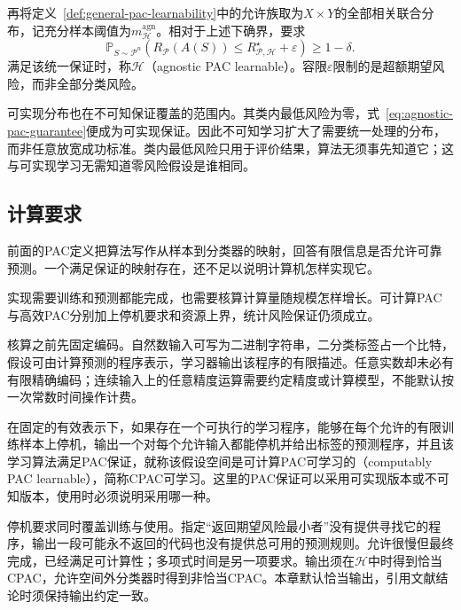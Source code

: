 再将定义~\ref{def:general-pac-learnability}中的允许族取为$X\times Y$的全部相关联合分布，记充分样本阈值为$m_{\mathcal H}^{\mathrm{agn}}$。相对于上述下确界，要求
\begin{equation}
 \mathbb P_{S\sim\mathcal P^n}\left(
 R_{\mathcal P}(A(S))\leq R_{\mathcal P,\mathcal H}^\star+\varepsilon
 \right)\geq1-\delta.
 \label{eq:agnostic-pac-guarantee}
\end{equation}
满足该统一保证时，称$\mathcal H$（agnostic PAC learnable）。容限$\varepsilon$限制的是超额期望风险，而非全部分类风险。

可实现分布也在不可知保证覆盖的范围内。其类内最低风险为零，式~\eqref{eq:agnostic-pac-guarantee}便成为可实现保证。因此不可知学习扩大了需要统一处理的分布，而非任意放宽成功标准。类内最低风险只用于评价结果，算法无须事先知道它；这与可实现学习无需知道零风险假设是谁相同。

\subsection{计算要求}
\label{sec:pac-computation-requirements}

前面的PAC定义把算法写作从样本到分类器的映射，回答有限信息是否允许可靠预测。一个满足保证的映射存在，还不足以说明计算机怎样实现它。

实现需要训练和预测都能完成，也需要核算计算量随规模怎样增长。可计算PAC与高效PAC分别加上停机要求和资源上界，统计风险保证仍须成立。

核算之前先固定编码。自然数输入可写为二进制字符串，二分类标签占一个比特，假设可由计算预测的程序表示，学习器输出该程序的有限描述。任意实数却未必有有限精确编码；连续输入上的任意精度运算需要约定精度或计算模型，不能默认按一次常数时间操作计费。

\begin{definition}[可计算PAC学习]
\label{def:computable-pac-learning}
在固定的有效表示下，如果存在一个可执行的学习程序，能够在每个允许的有限训练样本上停机，输出一个对每个允许输入都能停机并给出标签的预测程序，并且该学习算法满足PAC保证，就称该假设空间是可计算PAC可学习的（computably PAC learnable），简称CPAC可学习。这里的PAC保证可以采用可实现版本或不可知版本，使用时必须说明采用哪一种。
\end{definition}

停机要求同时覆盖训练与使用。指定“返回期望风险最小者”没有提供寻找它的程序，输出一段可能永不返回的代码也没有提供总可用的预测规则。允许很慢但最终完成，已经满足可计算性；多项式时间是另一项要求。输出须在$\mathcal H$中时得到恰当CPAC，允许空间外分类器时得到非恰当CPAC。本章默认恰当输出，引用文献结论时须保持输出约定一致。

